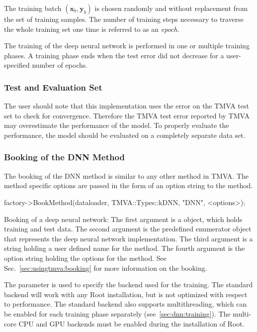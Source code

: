 The training batch $(\mathbf{x}_b,\mathbf{y}_b)$ is chosen randomly
and without replacement from the set of training samples. The number
of training steps necessary to traverse the whole training set one time is
referred to as an \textit{epoch}.

The training of the deep neural network is performed in one or
multiple training phases. A training phase ends when the test error
did not decrease for a user-specified number of epochs.

\subsubsection{Test and Evaluation Set}

The user should note that this implementation uses the error on the TMVA test set
to check for convergence. Therefore the TMVA test error reported by TMVA may
overestimate the performance of the model. To properly evaluate the performance, the
model should be evaluated on a completely separate data set.

\subsubsection{Booking of the DNN Method}

The booking of the DNN method is similar to any other method in TMVA. The method
specific options are passed in the form of an option string  to
the method.

\begin{codeexample}
\begin{tmvacode}
factory->BookMethod(dataloader, TMVA::Types::kDNN, "DNN", <options>);
\end{tmvacode}
\caption[.]{\codeexampleCaptionSize Booking of a deep neural network:
 The first argument is a  object, which holds training and test
 data. The second argument is the predefined enumerator object that represents
 the deep neural network implementation. The third argument is a string holding
 a user defined name for the method. The fourth argument is the option string
 holding the options for the method. See Sec.~\ref{sec:usingtmva:booking}
 for more information on the booking.}
\end{codeexample}

The  parameter is used to specify the backend used for the
training. The standard backend will work with any Root installation, but
is not optimized with respect to performance. The standard backend also
supports multithreading, which can be enabled for each training phase
separately (see~\ref{sec:dnn:training}). The multi-core CPU and GPU backends
 must be enabled during the installation of Root.

